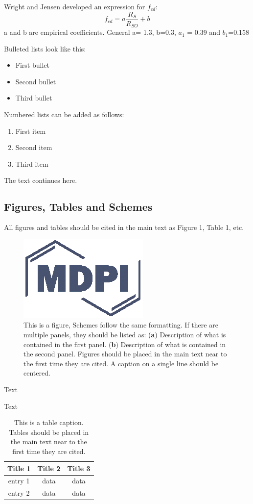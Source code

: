 \documentclass[hydrology,article,submit,moreauthors,pdftex]{Definitions/mdpi}
\begin{document}
Wright and Jensen \cite{wright1972peak} developed an expression for $f_{cd}$:
\begin{equation}
f_{cd} = a \frac{R_S}{R_{SO}} + b
\end{equation}
a and b are empirical coefficients. General a= 1.3, b=0.3, $a_1$ = 0.39 and $b_1$=0.158

Bulleted lists look like this:
\begin{itemize}[leftmargin=*,labelsep=5.8mm]
\item	First bullet
\item	Second bullet
\item	Third bullet
\end{itemize}

Numbered lists can be added as follows:
\begin{enumerate}[leftmargin=*,labelsep=4.9mm]
\item	First item 
\item	Second item
\item	Third item
\end{enumerate}

The text continues here.

\subsection{Figures, Tables and Schemes}

All figures and tables should be cited in the main text as Figure 1, Table 1, etc.

\begin{figure}[H]
\centering
\includegraphics[width=2 cm]{Definitions/logo-mdpi}
\caption{This is a figure, Schemes follow the same formatting. If there are multiple panels, they should be listed as: (\textbf{a}) Description of what is contained in the first panel. (\textbf{b}) Description of what is contained in the second panel. Figures should be placed in the main text near to the first time they are cited. A caption on a single line should be centered.}
\end{figure}   
 
Text

Text

\begin{table}[H]
\caption{This is a table caption. Tables should be placed in the main text near to the first time they are cited.}
\centering
\begin{tabular}{ccc}
\toprule
\textbf{Title 1}	& \textbf{Title 2}	& \textbf{Title 3}\\
\midrule
entry 1		& data			& data\\
entry 2		& data			& data\\
\bottomrule
\end{tabular}
\end{table}
\end{document}
